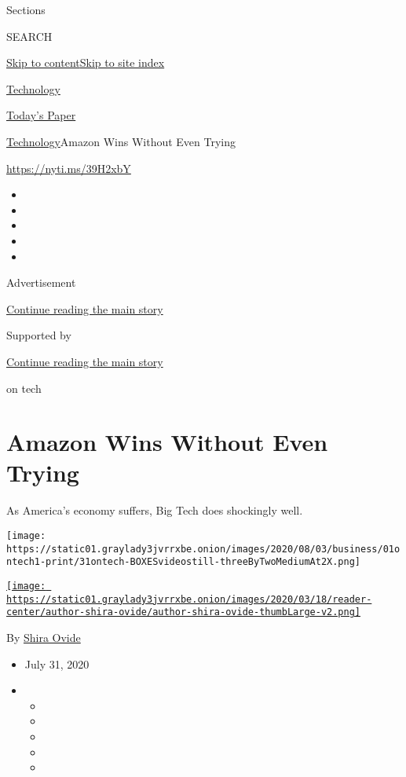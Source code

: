 Sections

SEARCH

\protect\hyperlink{site-content}{Skip to
content}\protect\hyperlink{site-index}{Skip to site index}

\href{https://www.nytimes3xbfgragh.onion/section/technology}{Technology}

\href{https://myaccount.nytimes3xbfgragh.onion/auth/login?response_type=cookie\&client_id=vi}{}

\href{https://www.nytimes3xbfgragh.onion/section/todayspaper}{Today's
Paper}

\href{/section/technology}{Technology}\textbar{}Amazon Wins Without Even
Trying

\href{https://nyti.ms/39H2xbY}{https://nyti.ms/39H2xbY}

\begin{itemize}
\item
\item
\item
\item
\item
\end{itemize}

Advertisement

\protect\hyperlink{after-top}{Continue reading the main story}

Supported by

\protect\hyperlink{after-sponsor}{Continue reading the main story}

on tech

\hypertarget{amazon-wins-without-even-trying}{%
\section{Amazon Wins Without Even
Trying}\label{amazon-wins-without-even-trying}}

As America's economy suffers, Big Tech does shockingly well.

\texttt{[image: https://static01.graylady3jvrrxbe.onion/images/2020/08/03/business/01ontech1-print/31ontech-BOXESvideostill-threeByTwoMediumAt2X.png]}

\href{https://www.nytimes3xbfgragh.onion/by/shira-ovide}{\texttt{[image: https://static01.graylady3jvrrxbe.onion/images/2020/03/18/reader-center/author-shira-ovide/author-shira-ovide-thumbLarge-v2.png]}}

By \href{https://www.nytimes3xbfgragh.onion/by/shira-ovide}{Shira Ovide}

\begin{itemize}
\item
  July 31, 2020
\item
  \begin{itemize}
  \item
  \item
  \item
  \item
  \item
  \end{itemize}
\end{itemize}

